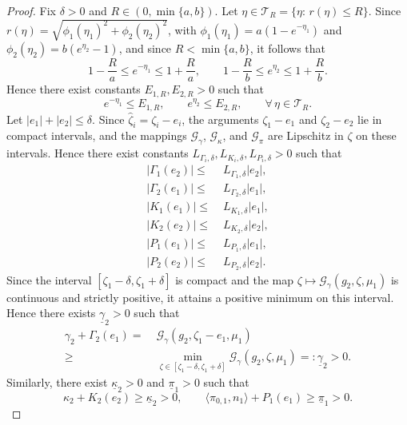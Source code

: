\documentclass[journal,twoside,web]{ieeecolor}
\begin{document}
\begin{proof}
Fix $\delta>0$ and $R\in(0,\min\{a,b\})$. Let $\eta\in\mathcal T_{R}=\{\eta:\,r(\eta)\le R\}$. Since $r(\eta)=\sqrt{\phi_1(\eta_1)^2+\phi_2(\eta_2)^2}$, with $\phi_1(\eta_1)=a(1-e^{-\eta_1})$ and $\phi_2(\eta_2)=b(e^{\eta_2}-1)$, and since $R<\min\{a,b\}$, it follows that
\begin{equation}
1-\frac{R}{a}\le e^{-\eta_1}\le 1+\frac{R}{a},\qquad
1-\frac{R}{b}\le e^{\eta_2}\le 1+\frac{R}{b}.
\end{equation}
Hence there exist constants $E_{1,R},E_{2,R}>0$ such that
\begin{equation}
e^{-\eta_1}\le E_{1,R},\qquad e^{\eta_2}\le E_{2,R},\qquad \forall\,\eta\in\mathcal T_{R}.
\end{equation}
Let $|e_1|+|e_2|\le\delta$. Since $\hat\zeta_i=\zeta_i-e_i$, the arguments $\zeta_1-e_1$ and $\zeta_2-e_2$ lie in compact intervals, and the mappings $\mathcal{G}_\gamma$, $\mathcal{G}_\kappa$, and $\mathcal{G}_\pi$ are Lipschitz in $\zeta$ on these intervals. Hence there exist constants $L_{\Gamma_i,\delta},L_{K_i,\delta},L_{P_i,\delta}>0$ such that
\begin{align}
|\Gamma_1(e_2)|\le&\; L_{\Gamma_1,\delta}|e_2|,\\
|\Gamma_2(e_1)|\le&\; L_{\Gamma_2,\delta}|e_1|,\\
|K_1(e_1)|\le&\; L_{K_1,\delta}|e_1|, \\ 
|K_2(e_2)|\le&\; L_{K_2,\delta}|e_2|, \\ 
|P_1(e_1)|\le&\; L_{P_1,\delta}|e_1|, \\ 
|P_2(e_2)|\le&\; L_{P_2,\delta}|e_2|.
\end{align}
Since the interval $[\zeta_1-\delta,\zeta_1+\delta]$ is compact and the map 
$\zeta \mapsto \mathcal{G}_\gamma(g_2,\zeta,\mu_1)$ is continuous and strictly positive, it attains a positive minimum on this interval. 
Hence there exists $\underline{\gamma}_2>0$ such that
\begin{align}
\label{eq-lower-gamma}
\gamma_2 + \Gamma_2(e_1) =\;& \nonumber  \mathcal{G}_\gamma(g_2,\zeta_1 - e_1,\mu_1) \\\ge\;&  \min_{\zeta \in [\zeta_1-\delta,\zeta_1+\delta]} \mathcal{G}_\gamma(g_2,\zeta,\mu_1) =: \underline{\gamma}_2 > 0.
\end{align}
Similarly, there exist $\underline{\kappa}_2>0$ and $\underline{\pi}_1>0$ such that
\begin{equation}
\label{eq-lower-bnd-kappa-pi}
\kappa_2+K_2(e_2)\ge \underline{\kappa}_2>0,\qquad
\langle \pi_{0,1},n_1\rangle+P_1(e_1)\ge \underline{\pi}_1>0.

\end{equation}
\end{proof}
\end{document}

